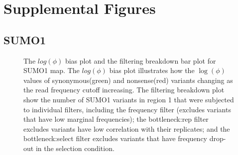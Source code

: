 \documentclass{article}
\begin{document}
\section{Supplemental Figures}
\subsection{SUMO1}
\begin{figure}[H]%
    \centering
    \qquad
    \caption{The $log(\phi)$ bias plot and the filtering breakdown bar plot for SUMO1 map. The $log(\phi)$ bias plot illustrates how the $\log(\phi)$ values of synonymous(green) and nonsense(red) variants changing as the read frequency cutoff increasing. The filtering breakdown plot show the number of SUMO1 variants in region 1 that were subjected to individual filters, including the frequency filter (excludes variants that have low marginal frequencies); the bottleneck:rep filter excludes variants have low correlation with their replicates; and the bottleneck:select filter excludes variants that have frequency drop-out in the selection condition.}%
    \label{fig:filtering}%
\end{figure}
\end{document}
